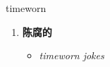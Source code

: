 
\begin{frame}
{\huge timeworn}
\begin{center}
\begin{enumerate}\Large
  \item \textbf{陈腐的}
  \begin{itemize}
    \item \em{\Large{timeworn jokes}}
  \end{itemize}
\end{enumerate}
\end{center}
\end{frame}
